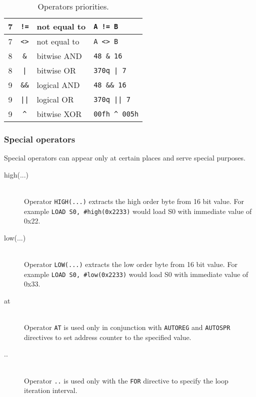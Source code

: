 \begin{table}[h!]
\begin{tabular}{|c|c|l|l|}
                7        & \texttt{!=}   & not equal to            & \texttt{A != B}            \\\hline
                7        & \texttt{<>}   & not equal to            & \texttt{A <> B}            \\\hline
                8        & \texttt{\&}   & bitwise AND             & \texttt{48 \& 16}          \\\hline
                8        & \texttt{|}    & bitwise OR              & \texttt{370q | 7}          \\\hline
                9        & \texttt{\&\&} & logical AND             & \texttt{48 \&\& 16}        \\\hline
                9        & \texttt{||}   & logical OR              & \texttt{370q || 7}         \\\hline
                9        & \texttt{\^{}} & bitwise XOR             & \texttt{00fh \^{} 005h}    \\\hline
            \end{tabular}
            \caption{Operators priorities.}
        \end{table}

        \subsubsection{Special operators}
            Special operators can appear only at certain places and serve special purposes.
            \begin{description}
                \item[high(...)]~\\
                    Operator \texttt{HIGH(...)} extracts the high order byte from 16 bit value. For example \texttt{LOAD  S0, \#high(0x2233)} would load S0 with immediate value of 0x22.
                \item[low(...)]~\\
                    Operator \texttt{LOW(...)} extracts the low order byte from 16 bit value. For example \texttt{LOAD  S0, \#low(0x2233)} would load S0 with immediate value of 0x33.
                \item[at]~\\
                    Operator \texttt{AT} is used only in conjunction with \texttt{AUTOREG} and \texttt{AUTOSPR} directives to set address counter to the specified value.
                \item[..]~\\
                    Operator \texttt{..} is used only with the \texttt{FOR} directive to specify the loop iteration interval.
            \end{description}

